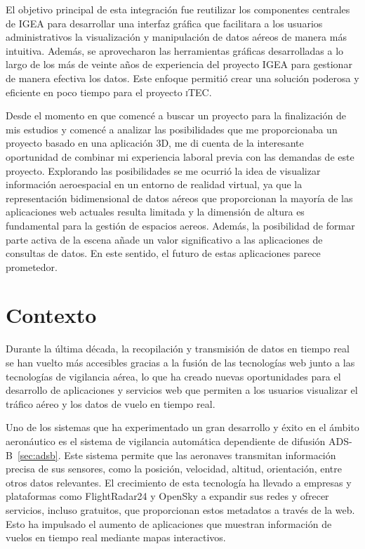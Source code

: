 \documentclass[a4paper, 11pt]{book}
\begin{document}
El objetivo principal de esta integración fue reutilizar los componentes centrales de \textsc{IGEA} para desarrollar una interfaz gráfica que facilitara a los usuarios administrativos la visualización y manipulación de datos aéreos de manera más intuitiva. Además, se aprovecharon las herramientas gráficas desarrolladas a lo largo de los más de veinte años de experiencia del proyecto \textsc{IGEA} para gestionar de manera efectiva los datos. Este enfoque permitió crear una solución poderosa y eficiente en poco tiempo para el proyecto \textsc{iTEC}.

Desde el momento en que comencé a buscar un proyecto para la finalización de mis estudios y comencé a analizar las posibilidades que me proporcionaba un proyecto basado en una aplicación \textsc{3D}, me di cuenta de la interesante oportunidad de combinar mi experiencia laboral previa con las demandas de este proyecto. 
Explorando las posibilidades se me ocurrió la idea de visualizar información aeroespacial en un entorno de realidad virtual, ya que la representación bidimensional de datos aéreos que proporcionan la mayoría de las aplicaciones web actuales resulta limitada y la dimensión de altura es fundamental para la gestión de espacios aereos. Además, la posibilidad de formar parte activa de la escena añade un valor significativo a las aplicaciones de consultas de datos. En este sentido, el futuro de estas aplicaciones parece prometedor.

\section{Contexto}
\label{sec:contexto}
Durante la última década, la recopilación y transmisión de datos en tiempo real se han vuelto más accesibles gracias a la fusión de las tecnologías web junto a las tecnologías de vigilancia aérea, lo que ha creado nuevas oportunidades para el desarrollo de aplicaciones y servicios web que permiten a los usuarios visualizar el tráfico aéreo y los datos de vuelo en tiempo real.

Uno de los sistemas que ha experimentado un gran desarrollo y éxito en el ámbito aeronáutico es el sistema de vigilancia automática dependiente de difusión \textsc{ADS-B}~\ref{sec:adsb}. Este sistema permite que las aeronaves transmitan información precisa de sus sensores, como la posición, velocidad, altitud, orientación, entre otros datos relevantes. 
El crecimiento de esta tecnología ha llevado a empresas y plataformas como FlightRadar24 y OpenSky a expandir sus redes y ofrecer servicios, incluso gratuitos, que proporcionan estos metadatos a través de la web. Esto ha impulsado el aumento de aplicaciones que muestran información de vuelos en tiempo real mediante mapas interactivos.
\end{document}

